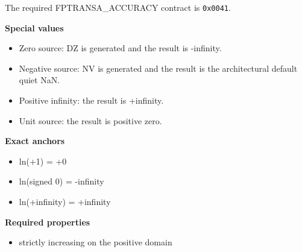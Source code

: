 The required FPTRANSA\_ACCURACY contract is \texttt{0x0041}.

\textbf{Special values}\par
\begin{itemize}
\item Zero source: DZ is generated and the result is -infinity.
\item Negative source: NV is generated and the result is the architectural default quiet NaN.
\item Positive infinity: the result is +infinity.
\item Unit source: the result is positive zero.
\end{itemize}

\textbf{Exact anchors}\par
\begin{itemize}
\item ln(+1) = +0
\item ln(signed 0) = -infinity
\item ln(+infinity) = +infinity
\end{itemize}

\textbf{Required properties}\par
\begin{itemize}
\item strictly increasing on the positive domain
\end{itemize}
